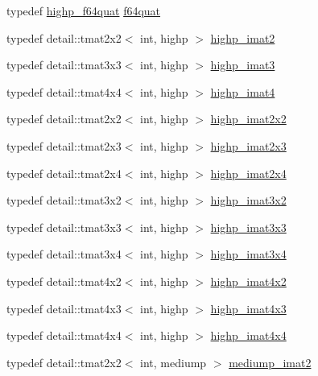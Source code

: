 \begin{CompactItemize}
\item 
typedef \hyperlink{group__gtc__type__precision_g9372e8b60f401fd94aba637b3ed17cfc}{highp\_\-f64quat} \hyperlink{group__gtc__type__precision_g860589eddc4ff95795a858318652b6ff}{f64quat}
\item 
typedef detail::tmat2x2$<$ int, highp $>$ \hyperlink{group__gtc__matrix__integer_g70eae282157f23589db24f4664bbf956}{highp\_\-imat2}
\item 
typedef detail::tmat3x3$<$ int, highp $>$ \hyperlink{group__gtc__matrix__integer_gf12b3aa7e16a88b1fcf51be9a132048c}{highp\_\-imat3}
\item 
typedef detail::tmat4x4$<$ int, highp $>$ \hyperlink{group__gtc__matrix__integer_g9ca2f5624891bd1ac993fcde4dd24ac1}{highp\_\-imat4}
\item 
typedef detail::tmat2x2$<$ int, highp $>$ \hyperlink{group__gtc__matrix__integer_g9646ff5ef973234755e63e727c5a37fc}{highp\_\-imat2x2}
\item 
typedef detail::tmat2x3$<$ int, highp $>$ \hyperlink{group__gtc__matrix__integer_g7b7079ab95ac8f533ac565fcf1341c76}{highp\_\-imat2x3}
\item 
typedef detail::tmat2x4$<$ int, highp $>$ \hyperlink{group__gtc__matrix__integer_g84aec2e744ecac589fe8d502266e8efc}{highp\_\-imat2x4}
\item 
typedef detail::tmat3x2$<$ int, highp $>$ \hyperlink{group__gtc__matrix__integer_g9780c1bc052a34c59dc95f4dd9e1a5c8}{highp\_\-imat3x2}
\item 
typedef detail::tmat3x3$<$ int, highp $>$ \hyperlink{group__gtc__matrix__integer_g4e7c11e49de5d71067b95a87c84308a8}{highp\_\-imat3x3}
\item 
typedef detail::tmat3x4$<$ int, highp $>$ \hyperlink{group__gtc__matrix__integer_g97ddf84f7ae0c5d4d3ecc18bb1d47449}{highp\_\-imat3x4}
\item 
typedef detail::tmat4x2$<$ int, highp $>$ \hyperlink{group__gtc__matrix__integer_gd998dce143f674a95a25241ff6e5e7d2}{highp\_\-imat4x2}
\item 
typedef detail::tmat4x3$<$ int, highp $>$ \hyperlink{group__gtc__matrix__integer_g9d51b6f1c8cd0b23c6fcc8dca924b14c}{highp\_\-imat4x3}
\item 
typedef detail::tmat4x4$<$ int, highp $>$ \hyperlink{group__gtc__matrix__integer_g969c88d5c7530beb80768205a054ee80}{highp\_\-imat4x4}
\item 
typedef detail::tmat2x2$<$ int, mediump $>$ \hyperlink{group__gtc__matrix__integer_gec03a8eef2ec2536f8bebffd0bac8192}{mediump\_\-imat2}
\item 

\end{CompactItemize}
